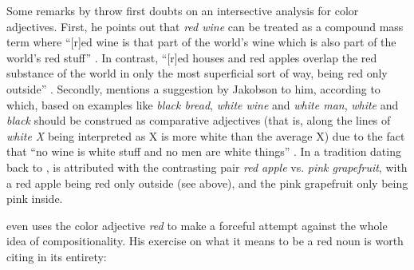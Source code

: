 Some remarks by \citet{Quine:1960} throw first doubts on 
an intersective analysis for color adjectives. First, he points out that \emph{red
  wine} can be treated as a compound mass term where
``[r]ed wine is that part of the world's wine which is also part of the
world's red stuff'' \citep[104]{Quine:1960}.  In contrast, ``[r]ed houses and
red apples overlap the red substance of the world in only the most superficial
sort of way, being red only outside'' \citep[104]{Quine:1960}. Secondly, \citet[132--133]{Quine:1960}
mentions a suggestion by Jakobson to him, according to which, based on
examples like \emph{black bread}, \emph{white wine} and \emph{white man}, \emph{white} and
\emph{black} should be construed as comparative adjectives (that is, along the
lines of \emph{white X} being interpreted as X is more white than the average
X) due to the fact that ``no wine is white stuff and no men are white
things'' \citep[133]{Quine:1960}. In a tradition dating back to
\citet{Partee:1984}, \citet{Quine:1960} is attributed with the contrasting
pair \emph{red apple} vs. \emph{pink grapefruit}, with a red apple being red
only outside (see above), and the pink grapefruit only being pink inside. 

\citet{Lahav:1989} even uses the color adjective \emph{red} to make a
forceful attempt against the whole idea of compositionality. 
His
exercise on what it means to be a red noun is worth citing in its
entirety:

